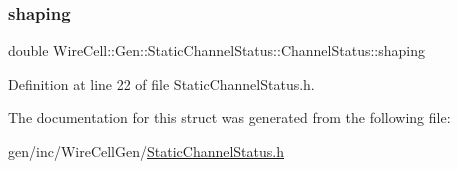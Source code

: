 \subsubsection{\texorpdfstring{shaping}{shaping}}
{\footnotesize\ttfamily double Wire\+Cell\+::\+Gen\+::\+Static\+Channel\+Status\+::\+Channel\+Status\+::shaping}



Definition at line 22 of file Static\+Channel\+Status.\+h.



The documentation for this struct was generated from the following file\+:\begin{DoxyCompactItemize}
\item 
gen/inc/\+Wire\+Cell\+Gen/\hyperlink{_static_channel_status_8h}{Static\+Channel\+Status.\+h}\end{DoxyCompactItemize}
